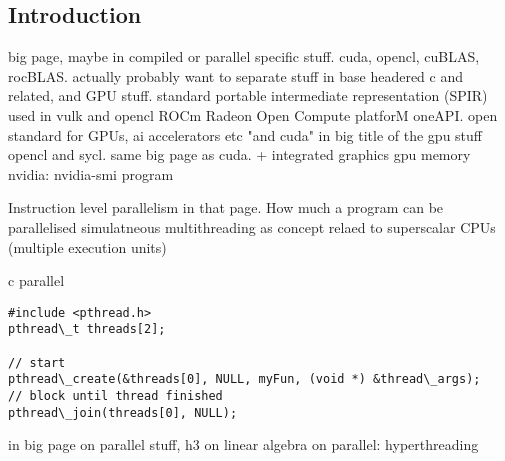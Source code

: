 
\subsection{Introduction}

big page, maybe in compiled or parallel specific stuff. cuda, opencl, cuBLAS, rocBLAS. actually probably want to separate stuff in base headered c and related, and GPU stuff.
standard portable intermediate representation (SPIR) used in vulk and opencl
ROCm Radeon Open Compute platforM
oneAPI. open standard for GPUs, ai accelerators etc
"and cuda" in big title of the gpu stuff
opencl and sycl. same big page as cuda.
+ integrated graphics
gpu memory
nvidia: nvidia-smi program




Instruction level parallelism in that page. How much a program can be parallelised
simulatneous multithreading as concept relaed to superscalar CPUs (multiple execution units)

c parallel

\begin{verbatim}
#include <pthread.h>
pthread\_t threads[2];

// start
pthread\_create(&threads[0], NULL, myFun, (void *) &thread\_args);
// block until thread finished
pthread\_join(threads[0], NULL);
\end{verbatim}


in big page on parallel stuff, h3 on linear algebra
on parallel: hyperthreading



